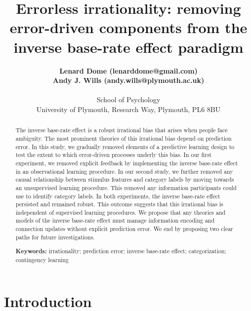 \documentclass[10pt,letterpaper]{article}
\title{Errorless irrationality: removing error-driven components from the inverse base-rate effect paradigm}
\author{{\large \bf Lenard Dome (lenarddome@gmail.com)} \\
  {\large \bf Andy J. Wills (andy.wills@plymouth.ac.uk)} \\ \\
  School of Psychology \\
  University of Plymouth, Research Way, Plymouth, PL6 8BU}
\begin{document}
\maketitle

\begin{abstract}

The inverse base-rate effect is a robust irrational bias that arises when people face ambiguity.
The most prominent theories of this irrational bias depend on prediction error.
In this study, we gradually removed elements of a predictive learning design to test the extent to which error-driven processes underly this bias.
In our first experiment, we removed explicit feedback by implementing the inverse base-rate effect in an observational learning procedure. 
In our second study, we further removed any causal relationship between stimulus features and category labels by moving towards an unsupervised learning procedure.
This removed any information participants could use to identify category labels.
In both experiments, the inverse base-rate effect persisted and remained robust.
This outcome suggests that this irrational bias is independent of supervised learning procedures.
We propose that any theories and models of the inverse base-rate effect must manage information encoding and connection updates without explicit prediction error.
We end by proposing two clear paths for future investigations.

\textbf{Keywords:} 
irrationality; prediction error; inverse base-rate effect; categorization; contingency learning
\end{abstract}


\section{Introduction}
\end{document}
